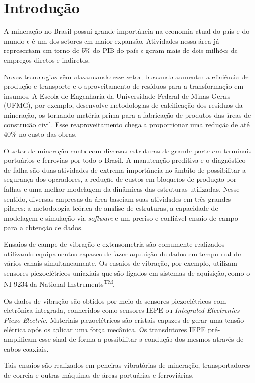 \documentclass[11pt]{abntex2}
\begin{document}
\makeatletter
	\imprimircapa
	\imprimirfolhaderosto

	\begin{resumo}
		
	\end{resumo}

	\tableofcontents
	\newpage
	\listoffigures
	\newpage
	
	\chapter{Introdução}
		A mineração no Brasil possui grande importância na economia atual do país e
		do mundo e é um dos setores em maior expansão. Atividades nessa área já
		representam em torno de 5\% do PIB do país e geram mais de dois milhões de
		empregos diretos e indiretos.\cite{pib}

		Novas tecnologias vêm alavancando esse setor, buscando aumentar a eficiência
		de produção e transporte e o aproveitamento de resíduos para a
		transformação em insumos. A Escola de Engenharia da Universidade Federal de
		Minas Gerais (UFMG), por exemplo, desenvolve metodologias de calcificação
		dos resíduos da mineração, os tornando matéria-prima para a fabricação de
		produtos das áreas de construção civil. Esse reaproveitamento chega a
		proporcionar uma redução de até 40\% no custo das obras.\cite{mineracaoUFMG}
		
		O setor de mineração conta com diversas estruturas de grande porte em
		terminais portuários e ferrovias por todo o Brasil. A manutenção
		preditiva e o diagnóstico de falha são duas atividades de extrema
		importância no âmbito de possibilitar a segurança dos operadores, a
		redução de custos em bloqueios de produção por falhas e uma melhor
		modelagem da dinâmicas das estruturas utilizadas. Nesse sentido,
		diversas empresas da área baseiam suas atividades em três grandes
		pilares: a metodologia teórica de análise de estruturas, a capacidade de
		modelagem e simulação via \textit{software} e um preciso e confiável
		ensaio de campo para a obtenção de dados.
		
		Ensaios de campo de vibração e extensometria são comumente realizados
		utilizando equipamentos capazes de fazer aquisição de dados em tempo
		real de vários canais simultaneamente. Os ensaios de vibração, por
		exemplo, utilizam sensores piezoelétricos uniaxiais que são ligados em
		sistemas de aquisição, como o NI-9234 da National
		Instruments\textsuperscript{TM}.
		
		Os dados de vibração são obtidos por meio de sensores piezoelétricos com
		eletrônica integrada, conhecidos como sensores IEPE ou \textit{Integrated
		Electronics Piezo-Electric}. Materiais piezoelétricos são cristais capazes de
		gerar uma tensão elétrica após os aplicar uma força mecânica.
		Os transdutores IEPE pré-amplificam esse sinal de forma a possibilitar a
		condução dos mesmos através de cabos coaxiais.

		Tais ensaios são realizados em peneiras vibratórias de mineração,
        transportadores de correia e outras máquinas de áreas portuárias e ferroviárias.

        
\end{document}
